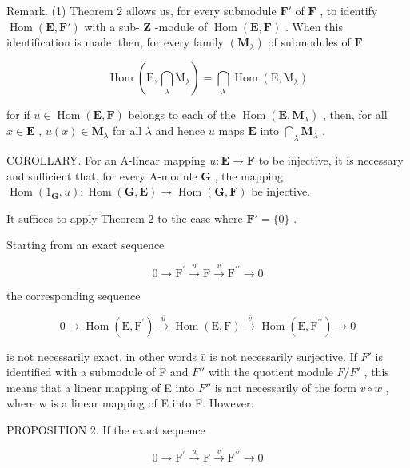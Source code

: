 Remark. (1) Theorem 2 allows us, for every submodule \(\mathbf{F}'\) of \(\mathbf{F}\) , to identify \(\operatorname{Hom}(\mathbf{E}, \mathbf{F}')\) with a sub- \(\mathbf{Z}\) -module of \(\operatorname{Hom}(\mathbf{E}, \mathbf{F})\) . When this identification is made, then, for every family \((\mathbf{M}_{\lambda})\) of submodules of \(\mathbf{F}\)

\[
\operatorname{Hom} \left(\mathrm{E}, \bigcap_ {\lambda} \mathrm{M} _ {\lambda}\right) = \bigcap_ {\lambda} \operatorname{Hom} (\mathrm{E}, \mathrm{M} _ {\lambda})
\]

for if \(u \in \operatorname{Hom}(\mathbf{E}, \mathbf{F})\) belongs to each of the \(\operatorname{Hom}(\mathbf{E}, \mathbf{M}_{\lambda})\) , then, for all \(x \in \mathbf{E}\) , \(u(x) \in \mathbf{M}_{\lambda}\) for all \(\lambda\) and hence \(u\) maps \(\mathbf{E}\) into \(\bigcap_{\lambda} \mathbf{M}_{\lambda}\) .

COROLLARY. For an A-linear mapping \(u: \mathbf{E} \to \mathbf{F}\) to be injective, it is necessary and sufficient that, for every A-module \(\mathbf{G}\) , the mapping \(\operatorname{Hom}(1_{\mathbf{G}}, u): \operatorname{Hom}(\mathbf{G}, \mathbf{E}) \to \operatorname{Hom}(\mathbf{G}, \mathbf{F})\) be injective.

It suffices to apply Theorem 2 to the case where \(\mathbf{F}' = \{0\}\) .

Starting from an exact sequence

\[
0 \longrightarrow \mathrm{F} ^ {\prime} \stackrel {u} {\longrightarrow} \mathrm{F} \stackrel {v} {\longrightarrow} \mathrm{F} ^ {\prime \prime} \longrightarrow 0
\]

the corresponding sequence

\[
0 \longrightarrow \operatorname{Hom} (\mathrm{E}, \mathrm{F} ^ {\prime}) \stackrel {\bar {u}} {\longrightarrow} \operatorname{Hom} (\mathrm{E}, \mathrm{F}) \stackrel {\bar {v}} {\longrightarrow} \operatorname{Hom} (\mathrm{E}, \mathrm{F} ^ {\prime \prime}) \longrightarrow 0
\]

is not necessarily exact, in other words \(\bar{v}\) is not necessarily surjective. If \(F'\) is identified with a submodule of F and \(F''\) with the quotient module \(F/F'\) , this means that a linear mapping of E into \(F''\) is not necessarily of the form \(v \circ w\) , where w is a linear mapping of E into F. However:

PROPOSITION 2. If the exact sequence

\[
0 \longrightarrow \mathrm{F} ^ {\prime} \stackrel {u} {\longrightarrow} \mathrm{F} \stackrel {v} {\longrightarrow} \mathrm{F} ^ {\prime \prime} \longrightarrow 0\tag{7}
\]

